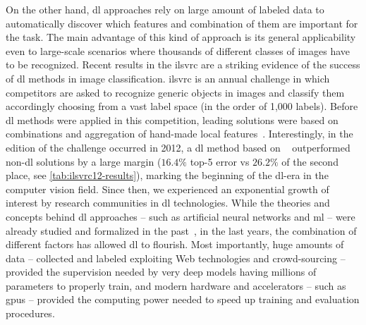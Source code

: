 On the other hand, \acrlong{dl} approaches rely on large amount of labeled data to automatically discover which features and combination of them are important for the task.
The main advantage of this kind of approach is its general applicability even to large-scale scenarios where thousands of different classes of images have to be recognized.
Recent results in the \gls{ilsvrc} are a striking evidence of the success of \gls{dl} methods in image classification.
\gls{ilsvrc} is an annual challenge in which competitors are asked to recognize generic objects in images and classify them accordingly choosing from a vast label space (in the order of 1,000 labels).
Before \gls{dl} methods were applied in this competition, leading solutions were based on combinations and aggregation of hand-made local features~\cite{harada2012graphical,akata2014good,sanchez2011high,mensink2012metric}.
Interestingly, in the edition of the challenge occurred in 2012, a \gls{dl} method based on ~\cite{krizhevsky2012imagenet} outperformed non-\gls{dl} solutions by a large margin ($16.4 \%$ top-5 error vs $26.2 \%$ of the second place, see \ref{tab:ilsvrc12-results}), marking the beginning of the \gls{dl}-era in the computer vision field.
Since then, we experienced an exponential growth of interest by research communities in \gls{dl} technologies.
While the theories and concepts behind \gls{dl} approaches -- such as artificial neural networks and \acrlong{ml} -- were already studied and formalized in the past~\cite{rosenblatt1958perceptron,rumelhart1985learning,lecun1989backpropagation,widrow199030}, in the last years, the combination of different factors has allowed \acrlong{dl} to flourish.
Most importantly, huge amounts of data -- collected and labeled exploiting Web technologies and crowd-sourcing -- provided the supervision needed by very deep models having millions of parameters to properly train, and modern hardware and accelerators -- such as \glspl{gpu} -- provided the computing power needed to speed up training and evaluation procedures.

